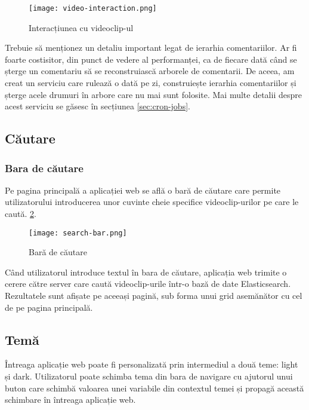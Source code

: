 \begin{figure}[h]
    \centering
    \texttt{[image: video-interaction.png]}
    \caption{Interacțiunea cu videoclip-ul}
    \label{fig:video-interaction}

\end{figure}

\par

Trebuie să menționez un detaliu important legat de ierarhia comentariilor. Ar fi foarte costisitor,
din punct de vedere al performanței, ca de fiecare dată când se șterge un comentariu să se reconstruiască
arborele de comentarii. De aceea, am creat un serviciu care rulează o dată pe zi, construiește ierarhia
comentariilor și șterge acele drumuri în arbore care nu mai sunt folosite. Mai multe detalii despre
acest serviciu se găsesc în secțiunea \ref{sec:cron-jobs}.

\subsection{Căutare}
\subsubsection{Bara de căutare}
Pe pagina principală a aplicației web se află o bară de căutare care permite utilizatorului
introducerea unor cuvinte cheie specifice videoclip-urilor pe care le caută.
\ref {fig:search-bar}.

\vspace{1em}
\begin{figure}[h]
    \centering
    \texttt{[image: search-bar.png]}
    \caption{Bară de căutare}
    \label{fig:search-bar}
\end{figure}

\par
Când utilizatorul introduce textul în bara de căutare, aplicația web trimite o cerere 
către server care caută videoclip-urile într-o bază de date Elasticsearch. Rezultatele
sunt afișate pe aceeași pagină, sub forma unui grid asemănător cu cel de pe pagina principală.

\subsection{Temă}
Întreaga aplicație web poate fi personalizată prin intermediul a două teme: light și dark.
Utilizatorul poate schimba tema din bara de navigare cu ajutorul unui buton care schimbă
valoarea unei variabile din contextul temei și propagă această schimbare în întreaga
aplicație web.

